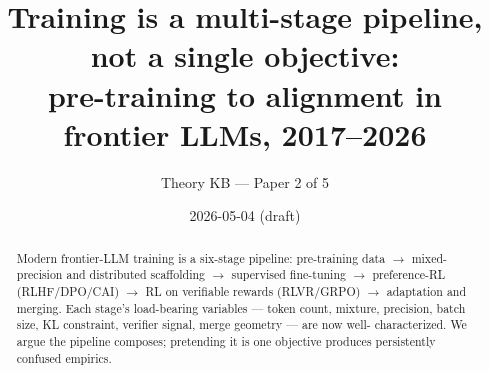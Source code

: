 








\title{
  Training is a multi-stage pipeline, not a single objective: \\
  pre-training to alignment in frontier LLMs, 2017--2026
}
\author{Theory KB --- Paper 2 of 5}
\date{2026-05-04 (draft)}


\maketitle

\begin{abstract}
Modern frontier-LLM training is a six-stage pipeline: pre-training data
$\to$ mixed-precision and distributed scaffolding $\to$ supervised
fine-tuning $\to$ preference-RL (RLHF/DPO/CAI) $\to$ RL on verifiable
rewards (RLVR/GRPO) $\to$ adaptation and merging. Each stage's
load-bearing variables --- token count, mixture, precision, batch size,
KL constraint, verifier signal, merge geometry --- are now well-
characterized. We argue the pipeline composes; pretending it is one
objective produces persistently confused empirics.
\end{abstract}

\tableofcontents




















